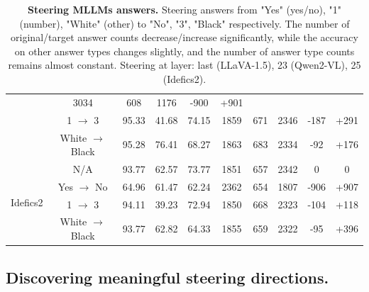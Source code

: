 \begin{table}[h]
{\begin{tabular}{lccccccccc}
            & 3034 
            & 608 
            & 1176 
            & -900 
            & +901 \\
            & 1 $\rightarrow$ 3 
            & 95.33 
            & 41.68 
            & 74.15 
            & 1859 
            & 671 
            & 2346 
            & -187 
            & +291 \\
            & White $\rightarrow$ Black 
            & 95.28 
            & 76.41 
            & 68.27 
            & 1863 
            & 683 
            & 2334 
            & -92 
            & +176 \\
        \midrule
            \multirow{4}{*}{Idefics2} 
            & N/A 
            & 93.77 
            & 62.57 
            & 73.77 
            & 1851 
            & 657 
            & 2342 
            & 0 
            & 0 \\
            & Yes $\rightarrow$ No 
            & 64.96 
            & 61.47 
            & 62.24 
            & 2362 
            & 654 
            & 1807 
            & -906 
            & +907 \\
            & 1 $\rightarrow$ 3 
            & 94.11 
            & 39.23 
            & 72.94 
            & 1850 
            & 668 
            & 2323 
            & -104 
            & +118 \\
            & White $\rightarrow$ Black 
            & 93.77 
            & 62.82 
            & 64.33 
            & 1855 
            & 659 
            & 2322 
            & -95 
            & +396 \\
        \bottomrule
        \end{tabular}
    }
    \caption{\textbf{Steering MLLMs answers.} Steering answers from "Yes" (yes/no), "1" (number), "White" (other) to "No", "3", "Black" respectively. The number of original/target answer counts decrease/increase significantly, while the accuracy on other answer types changes slightly, and the number of answer type counts remains almost constant. Steering at layer: last (LLaVA-1.5), 23 (Qwen2-VL), 25 (Idefics2).}
    \label{tab:model_steering_answers_other_models}
\end{table}



\subsection{Discovering meaningful steering directions.}
\label{sec:app_model_steering_discover_concepts}


